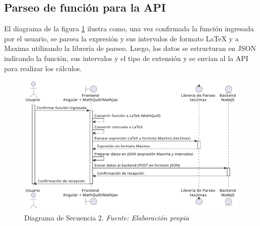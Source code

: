 \subsection{Parseo de función para la API}
El diagrama de  la figura \ref{fig:Diagrama_secuencia_2} ilustra como, una vez confirmada la función ingresada por el usuario, se parsea la expresión y sus intervalos de formato LaTeX y a Maxima utilizando la librería de parseo. Luego, los datos se estructuran en JSON indicando la función, sus intervalos y el tipo de extensión y se envían al la API para realizar los cálculos.
\begin{figure}[H]
	\centering
	\includegraphics[width=1\textwidth]{img/chapter04/DS2.pdf}
	\caption[Diagrama de Secuencia 2.]{Diagrama de Secuencia 2. \textit{Fuente: \textit{Elaboración propia}}}
	\label{fig:Diagrama_secuencia_2}
\end{figure}

 \newpage
 
